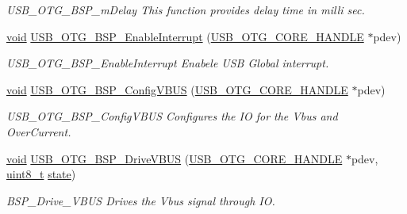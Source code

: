 \begin{DoxyCompactItemize}
\begin{DoxyCompactList}\small\item\em U\-S\-B\-\_\-\-O\-T\-G\-\_\-\-B\-S\-P\-\_\-m\-Delay This function provides delay time in milli sec. \end{DoxyCompactList}\item 
\hyperlink{group___n_a_m_e_ga18028b8badbf1ea7e704ccac3c488e82}{void} \hyperlink{group___u_s_b___b_s_p___exported___functions_prototype_ga38bdd94d09d00f27d1343fdb0babdfa1}{U\-S\-B\-\_\-\-O\-T\-G\-\_\-\-B\-S\-P\-\_\-\-Enable\-Interrupt} (\hyperlink{group___u_s_b___c_o_r_e___exported___types_gaf76054c11eb8a3367907aad7ae700e80}{U\-S\-B\-\_\-\-O\-T\-G\-\_\-\-C\-O\-R\-E\-\_\-\-H\-A\-N\-D\-L\-E} $\ast$pdev)
\begin{DoxyCompactList}\small\item\em U\-S\-B\-\_\-\-O\-T\-G\-\_\-\-B\-S\-P\-\_\-\-Enable\-Interrupt Enabele U\-S\-B Global interrupt. \end{DoxyCompactList}\item 
\hyperlink{group___n_a_m_e_ga18028b8badbf1ea7e704ccac3c488e82}{void} \hyperlink{group___u_s_b___b_s_p___exported___functions_prototype_ga02dee21bb9a092415782c0e1a460981c}{U\-S\-B\-\_\-\-O\-T\-G\-\_\-\-B\-S\-P\-\_\-\-Config\-V\-B\-U\-S} (\hyperlink{group___u_s_b___c_o_r_e___exported___types_gaf76054c11eb8a3367907aad7ae700e80}{U\-S\-B\-\_\-\-O\-T\-G\-\_\-\-C\-O\-R\-E\-\_\-\-H\-A\-N\-D\-L\-E} $\ast$pdev)
\begin{DoxyCompactList}\small\item\em U\-S\-B\-\_\-\-O\-T\-G\-\_\-\-B\-S\-P\-\_\-\-Config\-V\-B\-U\-S Configures the I\-O for the Vbus and Over\-Current. \end{DoxyCompactList}\item 
\hyperlink{group___n_a_m_e_ga18028b8badbf1ea7e704ccac3c488e82}{void} \hyperlink{group___u_s_b___b_s_p___exported___functions_prototype_ga1a0b196001899cd61bc722d080ca8161}{U\-S\-B\-\_\-\-O\-T\-G\-\_\-\-B\-S\-P\-\_\-\-Drive\-V\-B\-U\-S} (\hyperlink{group___u_s_b___c_o_r_e___exported___types_gaf76054c11eb8a3367907aad7ae700e80}{U\-S\-B\-\_\-\-O\-T\-G\-\_\-\-C\-O\-R\-E\-\_\-\-H\-A\-N\-D\-L\-E} $\ast$pdev, \hyperlink{stdint_8h_aba7bc1797add20fe3efdf37ced1182c5}{uint8\-\_\-t} \hyperlink{posix_2posix_2pios__flashfs__logfs_8c_a13a6109e91ad12705df96a0f2743c630}{state})
\begin{DoxyCompactList}\small\item\em B\-S\-P\-\_\-\-Drive\-\_\-\-V\-B\-U\-S Drives the Vbus signal through I\-O. \end{DoxyCompactList}\end{DoxyCompactItemize}


